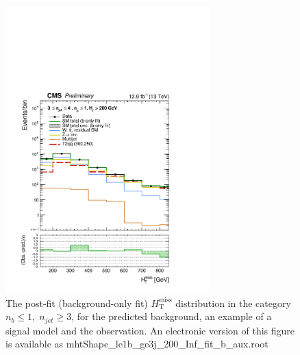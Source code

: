 \begin{figure}[tbhp]
    \caption{ 
    The post-fit (background-only fit) $H_{\mathrm{T}}^{\mathrm{miss}}$ distribution in the category $n_{b}\leq 1, \; n_{jet} \geq 3$, 
    for the predicted background, an example of a signal model and the observation.
    An electronic version of this figure is available as mhtShape\_le1b\_ge3j\_200\_Inf\_fit\_b\_aux.root
    \label{fig:mhtShape_le1b_ge3j_fit_b} }
  \begin{center}
  \includegraphics[width=0.7\textwidth]{mhtShape_le1b_ge3j_200_Inf_fit_b_aux}
  \end{center}
\end{figure}


